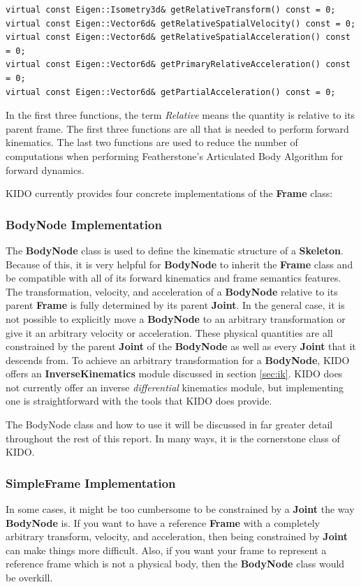 \begin{lstlisting}
virtual const Eigen::Isometry3d& getRelativeTransform() const = 0;
virtual const Eigen::Vector6d& getRelativeSpatialVelocity() const = 0;
virtual const Eigen::Vector6d& getRelativeSpatialAcceleration() const = 0;
virtual const Eigen::Vector6d& getPrimaryRelativeAcceleration() const = 0;
virtual const Eigen::Vector6d& getPartialAcceleration() const = 0;
\end{lstlisting}

In the first three functions, the term \textit{Relative} means the quantity is relative to its parent frame. The first three functions are all that is needed to perform forward kinematics. The last two functions are used to reduce the number of computations when performing Featherstone's Articulated Body Algorithm for forward dynamics.

KIDO currently provides four concrete implementations of the \textbf{Frame} class:

\subsubsection{BodyNode Implementation}

The \textbf{BodyNode} class is used to define the kinematic structure of a \textbf{Skeleton}. Because of this, it is very helpful for \textbf{BodyNode} to inherit the \textbf{Frame} class and be compatible with all of its forward kinematics and frame semantics features. The transformation, velocity, and acceleration of a \textbf{BodyNode} relative to its parent \textbf{Frame} is fully determined by its parent \textbf{Joint}. In the general case, it is not possible to explicitly move a \textbf{BodyNode} to an arbitrary transformation or give it an arbitrary velocity or acceleration. These physical quantities are all constrained by the parent \textbf{Joint} of the \textbf{BodyNode} as well as every \textbf{Joint} that it descends from. To achieve an arbitrary transformation for a \textbf{BodyNode}, KIDO offers an \textbf{InverseKinematics} module discussed in section \ref{sec:ik}. KIDO does not currently offer an inverse \textit{differential} kinematics module, but implementing one is straightforward with the tools that KIDO does provide.

The BodyNode class and how to use it will be discussed in far greater detail throughout the rest of this report. In many ways, it is the cornerstone class of KIDO.

\subsubsection{SimpleFrame Implementation}
\label{sec:SimpleFrame}
In some cases, it might be too cumbersome to be constrained by a \textbf{Joint} the way \textbf{BodyNode} is. If you want to have a reference \textbf{Frame} with a completely arbitrary transform, velocity, and acceleration, then being constrained by \textbf{Joint} can make things more difficult. Also, if you want your frame to represent a reference frame which is not a physical body, then the \textbf{BodyNode} class would be overkill.

